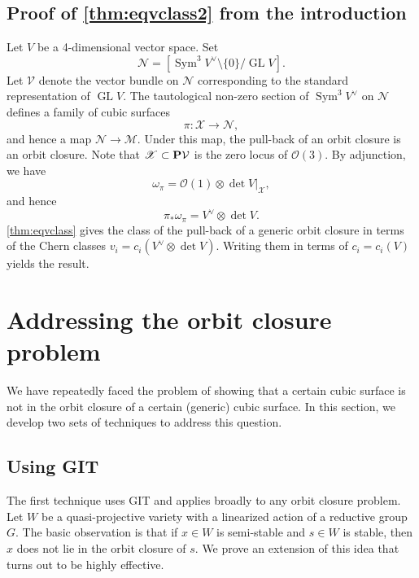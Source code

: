 \documentclass[reqno]{amsart}
\renewcommand{\to}{{\longrightarrow}}
\renewcommand {\P}{{\bf P}}
\providecommand{\GL}{\operatorname{GL}}
\providecommand{\Sym}{\operatorname{Sym}}
\numberwithin{equation}{section}
\renewcommand{\O}{\mathcal{O}}
\begin{document}
\subsection{Proof of \texorpdfstring{\autoref{thm:eqvclass2}}{second theorem} from the introduction}\label{proof:eqvclass2}
Let $V$ be a 4-dimensional vector space.
Set
\[\mathscr{N} = \left[ \Sym^3V^{\vee} \setminus \{0\} / \GL V \right]. \]
Let $\mathcal{V}$ denote the vector bundle on $\mathscr{N}$ corresponding to the standard representation of $\GL V$.
The tautological non-zero section of $\Sym^3V^{\vee}$ on $\mathscr{N}$ defines a family of cubic surfaces
\[ \pi \colon \mathscr{X} \to \mathscr{N},\]
and hence a map $\mathscr{N} \to \mathscr{M}$.
Under this map, the pull-back of an orbit closure is an orbit closure.
Note that $\mathscr{X} \subset \P \mathcal{V}$ is the zero locus of $\O(3)$.
By adjunction, we have
\[ \omega_{\pi} = \O(1) \otimes \det V |_{\mathscr{X}},\]
and hence
\[ \pi_* \omega_{\pi} = V^{\vee} \otimes \det V.\]
\autoref{thm:eqvclass} gives the class of the pull-back of a generic orbit closure in terms of the Chern classes $v_i = c_i(V^{\vee} \otimes \det V)$.
Writing them in terms of $c_i = c_i(V)$ yields the result.

\section{Addressing the orbit closure problem}
\label{sec:orbclosure}
We have repeatedly faced the problem of showing that a certain cubic surface is not in the orbit closure of a certain (generic) cubic surface.
In this section, we develop two sets of techniques to address this question.

\subsection{Using GIT}
The first technique uses GIT and applies broadly to any orbit closure problem.
Let $W$ be a quasi-projective variety with a linearized action of a reductive group $G$.
The basic observation is that if $x \in W$ is semi-stable and $s \in W$ is stable, then $x$ does not lie in the orbit closure of $s$.
We prove an extension of this idea that turns out to be highly effective.
\end{document}
